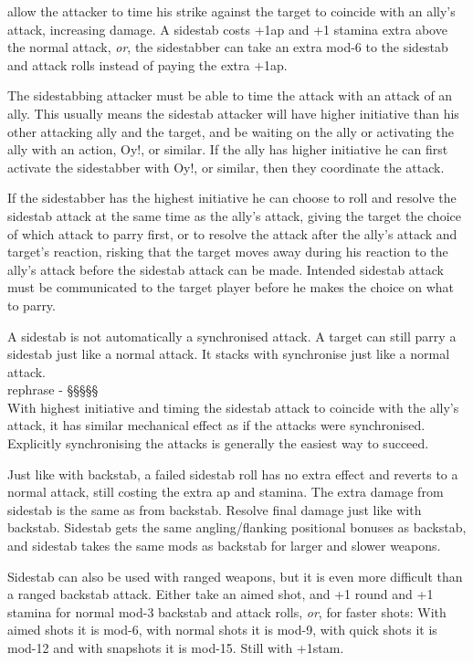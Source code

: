  allow the attacker to time his strike against the target to coincide with an ally's attack, increasing damage. A sidestab costs +1ap and +1 stamina extra above the normal attack, \emph{or}, the sidestabber can take an extra mod-6 to the sidestab and attack rolls instead of paying the extra +1ap.

The sidestabbing attacker must be able to time the attack with an attack of an ally. This usually means the sidestab attacker will have higher initiative than his other attacking ally and the target, and be waiting on the ally or activating the ally with an action, Oy!, or similar. If the ally has higher initiative he can first activate the sidestabber with Oy!, or similar, then they coordinate the attack.

If the sidestabber has the highest initiative he can choose to roll and resolve the sidestab attack at the same time as the ally's attack, giving the target the choice of which attack to parry first, or to resolve the attack after the ally's attack and target's reaction, risking that the target moves away during his reaction to the ally's attack before the sidestab attack can be made. Intended sidestab attack must be communicated to the target player before he makes the choice on what to parry.

A sidestab is not automatically a synchronised attack. A target can still parry a sidestab just like a normal attack. It stacks with synchronise just like a normal attack.\\
\todo rephrase - §§§§§\\
With highest initiative and timing the sidestab attack to coincide with the ally's attack, it has similar mechanical effect as if the attacks were synchronised. Explicitly synchronising the attacks is generally the easiest way to succeed.

Just like with backstab, a failed sidestab roll has no extra effect and reverts to a normal attack, still costing the extra ap and stamina. The extra damage from sidestab is the same as from backstab. Resolve final damage just like with backstab. Sidestab gets the same angling/flanking positional bonuses as backstab, and sidestab takes the same mods as backstab for larger and slower weapons.

Sidestab can also be used with ranged weapons, but it is even more difficult than a ranged backstab attack. Either take an aimed shot, and +1 round and +1 stamina for normal mod-3 backstab and attack rolls, \emph{or}, for faster shots: With aimed shots it is mod-6, with normal shots it is mod-9, with quick shots it is mod-12 and with snapshots it is mod-15. Still with +1stam.


